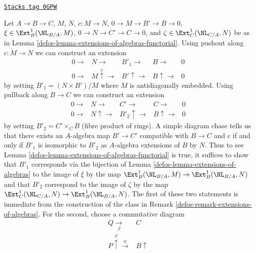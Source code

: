 \begin{remark}
\label{defos-remark-extensions-of-algebras-functorial}
\href{https://stacks.math.columbia.edu/tag/0GPW}{\texttt{Stacks tag 0GPW}}

Let $A \to B \to C$, $M$, $N$, $c : M \to N$,
$0 \to M \to B' \to B \to 0$, $\xi \in \Ext^1_B(\NL_{B/A}, M)$,
$0 \to N \to C' \to C \to 0$, and $\zeta \in \Ext^1_C(\NL_{C/A}, N)$ be as in
Lemma \ref{defos-lemma-extensions-of-algebras-functorial}.
Using pushout along $c : M \to N$ we can construct an extension
$$
\begin{array}{ccccc}0 \longrightarrow & N \longrightarrow & B'_1 \longrightarrow & B \longrightarrow & 0 \\ 0 \longrightarrow & M \overset{c}{\uparrow}\longrightarrow & B' \uparrow\longrightarrow & B \uparrow\longrightarrow & 0\end{array}
$$
by setting $B'_1 = (N \times B')/M$ where $M$ is antidiagonally
embedded. Using pullback along $B \to C$ we can construct an extension
$$
\begin{array}{ccccc}0 \longrightarrow & N \longrightarrow & C' \longrightarrow & C \longrightarrow & 0 \\ 0 \longrightarrow & N \uparrow\longrightarrow & B'_2 \uparrow\longrightarrow & B \uparrow\longrightarrow & 0\end{array}
$$
by setting $B'_2 = C' \times_C B$ (fibre product of rings). A simple diagram
chase tells us that there exists an $A$-algebra map $B' \to C'$
compatible with $B \to C$ and $c$ if and only if $B'_1$ is isomorphic
to $B'_2$ as $A$-algebra extensions of $B$ by $N$. Thus to see
Lemma \ref{defos-lemma-extensions-of-algebras-functorial}
is true, it suffices to show that $B'_1$ corresponds via the bijection of
Lemma \ref{defos-lemma-extensions-of-algebras}
to the image of $\xi$ by the map
$\Ext^1_B(\NL_{B/A}, M) \to \Ext^1_B(\NL_{B/A}, N)$
and that $B'_2$ correspond to the image of $\zeta$ by the map
$\Ext^1_C(\NL_{C/A}, N) \to \Ext^1_B(\NL_{B/A}, N)$.
The first of these two statements is immediate from the construction
of the class in Remark \ref{defos-remark-extensions-of-algebras}.
For the second, choose a commutative diagram
$$
\begin{array}{cc}Q \underset{\beta}{\longrightarrow} & C \\ P \overset{\varphi}{\uparrow}\overset{\alpha}{\longrightarrow} & B \uparrow\end{array}
$$
\end{remark}
